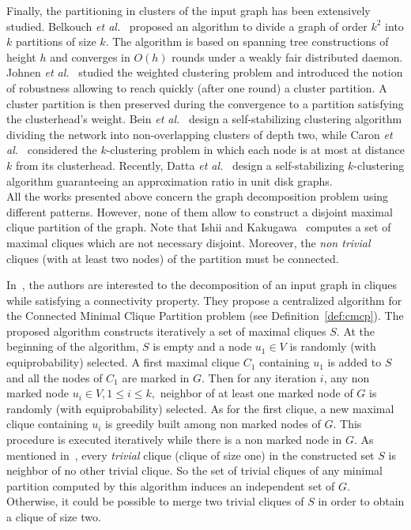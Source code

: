 \documentclass[11pt,letterpaper,onecolumn]{article}
\begin{document}
Finally, the partitioning in clusters of the input graph has been extensively studied. Belkouch \emph{et al.}~\cite{BelkouchBCD02} proposed an algorithm to divide a graph of order $k^2$ into $k$ partitions of size $k$. The algorithm is based on spanning tree constructions of height $h$ and converges in $O(h)$ rounds under a weakly fair distributed daemon. Johnen \emph{et al.}~\cite{JohnenN09} studied the weighted clustering problem and introduced the notion of robustness allowing to reach quickly (after one round) a cluster partition. A cluster partition is then preserved during the convergence to a partition satisfying the clusterhead's weight. Bein \emph{et al.}~\cite{BeinDJV05} design a self-stabilizing clustering algorithm dividing the network into non-overlapping clusters of depth two, while Caron \emph{et al.}~\cite{CaronDDL10} considered the $k$-clustering problem in which each node is at most at distance $k$ from its clusterhead. Recently, Datta \emph{et al.}~\cite{DattaLDHR12} design a self-stabilizing $k$-clustering algorithm guaranteeing an approximation ratio in unit disk graphs.\\

All the works presented above concern the graph decomposition problem using different patterns. However, none of them allow to construct a disjoint maximal clique partition of the graph. Note that Ishii and Kakugawa~\cite{IshiiK02} computes a set of maximal cliques which are not necessary disjoint. Moreover, the \emph{non trivial} cliques (with at least two nodes) of the partition must be connected. 

 In~\cite{DelbotLP13}, the authors are interested to the decomposition of an input graph in cliques while satisfying a connectivity property. They propose a centralized algorithm for the Connected Minimal Clique Partition problem (see Definition~\ref{def:cmcp}). The proposed algorithm constructs iteratively a set of maximal cliques $S$. At the beginning of the algorithm, $S$ is empty and a node $u_1 \in V$ is randomly (with equiprobability) selected. A first maximal clique $C_1$ containing $u_1$ is added to $S$ and all the nodes of $C_1$ are marked in $G$. Then for any iteration $i$, any non marked node $u_i \in V, 1 \leq i \leq k,$ neighbor of at least one marked node of $G$ is randomly (with equiprobability) selected. As for the first clique, a new maximal clique containing $u_i$ is greedily built among non marked nodes of $G$. This procedure is executed 
iteratively while there is a non marked node in $G$. As mentioned in~\cite{DelbotLP13}, every \emph{trivial} clique (clique of size one) in the constructed set $S$ is neighbor of no other trivial clique. So the set of trivial cliques of any minimal partition computed by this algorithm induces an independent set of $G$. Otherwise, it could be possible to merge two trivial cliques of $S$ in order to obtain a clique of size two.
\end{document}
